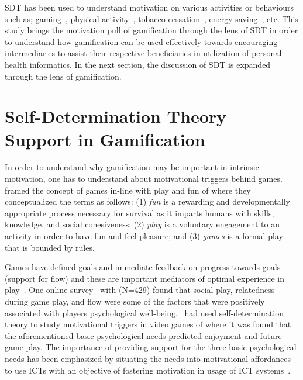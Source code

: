 SDT has been used to understand motivation on various activities or behaviours such as; gaming~\citep{ryan2006:motivationalpull}, physical activity~\citep{power2011:obesity}, tobacco cessation~\citep{williams2006:testing}, energy saving~\citep{webb2013:self}, etc. This study brings the motivation pull of gamification through the lens of SDT in order to understand how gamification can be used effectively towards encouraging intermediaries to assist their respective beneficiaries in utilization of personal health informatics. In the next section, the discussion of SDT is expanded through the lens of gamification.
\section{Self-Determination Theory Support in Gamification}
In order to understand why gamification may be important in intrinsic motivation, one has to understand about motivational triggers behind games.~\cite{knaving2013designing} framed the concept of games in-line with play and fun of where they conceptualized the terms as follows: (1) \emph{fun} is a rewarding and developmentally appropriate process necessary for survival as it imparts humans with skills, knowledge, and social cohesiveness; (2) \emph{play} is a voluntary engagement to an activity in order to have fun and feel pleasure; and (3) \emph{games} is a formal play that is bounded by rules. 

Games have defined goals and immediate feedback on progress towards goals (support for flow) and these are important mediators of optimal experience in play~\citep{knaving2013designing}. One online survey~\citep{vella2013positively} with (N=429) found that social play, relatedness during game play, and flow were some of the factors that were positively associated with players psychological well-being.~\cite{ryan2006:motivationalpull} had used self-determination theory to study motivational triggers in video games of where it was found that the aforementioned basic psychological needs predicted enjoyment and future game play. The importance of providing support for the three basic psychological needs has been emphasized  by situating the needs into motivational affordances to use ICTs with an objective of fostering motivation in usage of ICT systems~\citep{zhang2008motivational}. 

